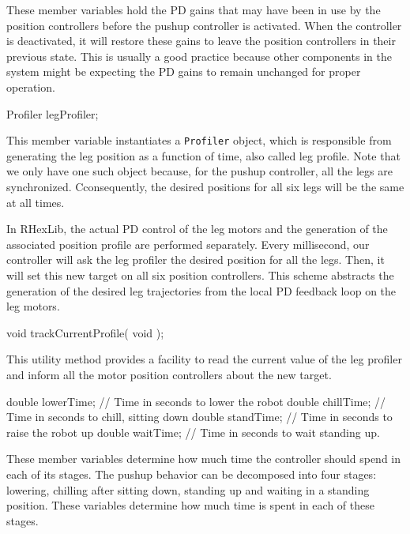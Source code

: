 These member variables hold the PD gains that may have been in use by the
position controllers before the pushup controller is activated. When the
controller is deactivated, it will restore these gains to leave the position
controllers in their previous state. This is usually a good practice because
other components in the system might be expecting the PD gains to remain
unchanged for proper operation.

\begin{codesegment}
  Profiler         legProfiler;
\end{codesegment}

This member variable instantiates a {\tt Profiler} object, which is
responsible from generating the leg position as a function of time, also
called leg profile. Note that we only have one such object because, for the
pushup controller, all the legs are synchronized. Cconsequently, the desired
positions for all six legs will be the same at all times.

In RHexLib, the actual PD control of the leg motors and the generation of
the associated position profile are performed separately. Every millisecond,
our controller will ask the leg profiler the desired position for all the
legs. Then, it will set this new target on all six position
controllers. This scheme abstracts the generation of the desired leg
trajectories from the local PD feedback loop on the leg motors.

\begin{codesegment}
  void trackCurrentProfile( void );
\end{codesegment}

This utility method provides a facility to read the current value of the leg 
profiler and inform all the motor position controllers about the new target.

\begin{codesegment}
  double lowerTime;  // Time in seconds to lower the robot
  double chillTime;  // Time in seconds to chill, sitting down
  double standTime;  // Time in seconds to raise the robot up
  double waitTime;   // Time in seconds to wait standing up.
\end{codesegment}

These member variables determine how much time the controller should spend
in each of its stages. The pushup behavior can be decomposed into four
stages: lowering, chilling after sitting down, standing up and waiting in a
standing position. These variables determine how much time is spent in each
of these stages.

